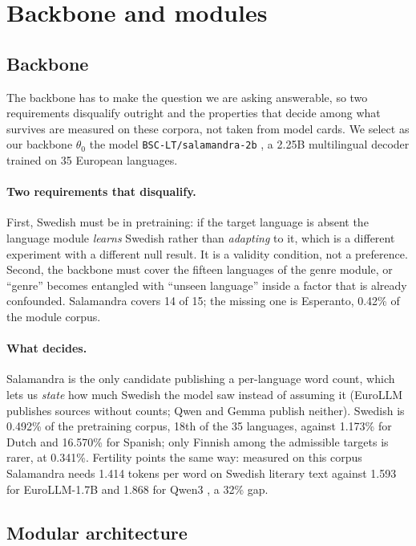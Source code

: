\documentclass[10pt,twocolumn,a4paper]{article}
\newcommand{\tec}[1]{{\small\texttt{#1}}}
\begin{document}
\section{Backbone and modules}

\subsection{Backbone}
\label{sec:backbone}

The backbone has to make the question we are asking answerable, so two
requirements disqualify outright and the properties that decide among what
survives are measured on these corpora, not taken from model cards. We select as
our backbone $\theta_0$ the model
\tec{BSC-LT/salamandra-2b} \cite{salamandra2025}, a 2.25B multilingual decoder
trained on 35 European languages.

\paragraph{Two requirements that disqualify.} First, Swedish must be in
pretraining: if the target language is absent the language module \emph{learns}
Swedish rather than \emph{adapting} to it, which is a different experiment with
a different null result. It is a validity condition, not a preference. Second,
the backbone must cover the fifteen languages of the genre module, or ``genre''
becomes entangled with ``unseen language'' inside a factor that is already
confounded. Salamandra covers 14 of 15; the missing one is Esperanto, 0.42\% of
the module corpus.

\paragraph{What decides.} Salamandra is the only candidate publishing a
per-language word count, which lets us \emph{state} how much Swedish the model
saw instead of assuming it (EuroLLM publishes sources without counts; Qwen and Gemma publish
neither). Swedish is 0.492\% of the pretraining corpus, 18th of the 35
languages, against 1.173\% for Dutch and 16.570\% for Spanish; only Finnish
among the admissible targets is rarer, at 0.341\%. Fertility points the same
way: measured on this corpus Salamandra needs 1.414 tokens per word on Swedish
literary text against 1.593 for EuroLLM-1.7B \cite{martins2024} and 1.868 for
Qwen3 \cite{qwen3}, a 32\% gap.

\subsection{Modular architecture}
\end{document}
